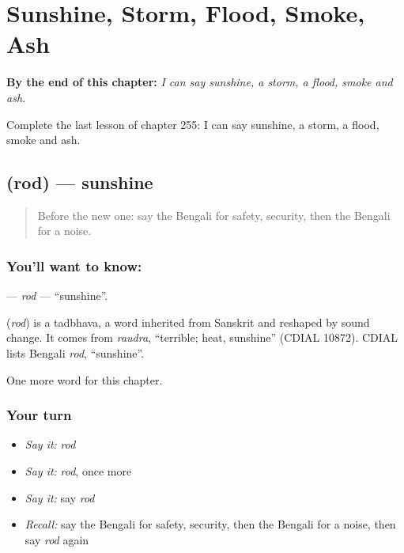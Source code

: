 
\chapter{Sunshine, Storm, Flood, Smoke, Ash}
\label{ch:bn-sunshine-storm-flood-smoke-ash}

\begin{chapteropening}
\textbf{By the end of this chapter:} \emph{I can say sunshine, a storm, a flood, smoke and ash.}

Complete the last lesson of chapter 255: I can say sunshine, a storm, a flood, smoke and ash.
\end{chapteropening}

\section[\texorpdfstring{\bn{রোদ} (rod)}{রোদ (rod)}]{ (rod) — sunshine}

\label{lesson:BN-C255-rod}



\begin{quote}
Before the new one: say the Bengali for safety, security, then the Bengali for a noise.
\end{quote}

\subsection*{You'll want to know: }
\textbf{} — \emph{rod} — \textquotedblleft{}sunshine\textquotedblright{}.

\begin{cousinweb}
\textbf{} (\emph{rod}) is a tadbhava, a word inherited from Sanskrit and reshaped by sound change. It comes from \emph{raudra}, \textquotedblleft{}terrible; heat, sunshine\textquotedblright{} (CDIAL 10872). CDIAL lists Bengali \emph{rod}, \textquotedblleft{}sunshine\textquotedblright{}.
\end{cousinweb}

\begin{grammarlens}[title={What you've built}]
One more word for this chapter.
\end{grammarlens}

\subsection*{Your turn}
\begin{itemize}
\raggedright
  \item \emph{Say it:} \emph{rod}
  \item \emph{Say it:} \emph{rod}, once more
  \item \emph{Say it:} say \emph{rod}
  \item \emph{Recall:} say the Bengali for safety, security, then the Bengali for a noise, then say \emph{rod} again
\end{itemize}

